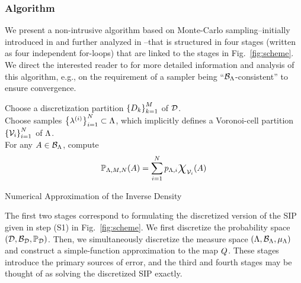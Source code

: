 \subsubsection{Algorithm}\label{sec:set-algorithm}
We present a non-intrusive algorithm based on Monte-Carlo sampling\---initially introduced in \cite{BET+14} and further analyzed in \cite{BET+14-arxiv}\---that is structured in four stages (written as four independent for-loops) that are linked to the stages in Fig.~\ref{fig:scheme}. 
We direct the interested reader to \cite{BET+14-arxiv} for more detailed information and analysis of this algorithm, e.g., on the requirement of a sampler being ``$\mathcal{B}_{{\Lambda}}$-consistent'' to ensure convergence. 


\begin{algorithm}[hbtp]
\DontPrintSemicolon
Choose a discretization partition $\left\{D_k\right\}_{k=1}^{M}$ of $\mathcal{D}$.\\
	Choose samples $\left\{\lambda^{(i)}\right\}_{i=1}^{N} \subset {\Lambda}$, which implicitly defines a Voronoi-cell partition $\left\{\mathcal{V}_i\right\}_{i=1}^{N}$ of ${\Lambda}$.\\
	For any $A\in \mathcal{B}_{{\Lambda}}$, compute 
	\begin{equation}
	\PP_{\pspace, \ndiscs, \nsamps} (A) = \sum_{\iparam=1}^\nsamps p_{\pspace, \iparam} \Chi_{\VV_\iparam} (A) 
	\end{equation}
 \caption{Numerical Approximation of the Inverse Density}
 \label{alg:inv_density}
\end{algorithm}
\FloatBarrier

The first two stages correspond to formulating the discretized version of the SIP given in step (S1) in Fig.~\ref{fig:scheme}. 
We first discretize the probability space $(\mathcal{D}, \mathcal{B}_{\mathcal{D}}, \operatorname*{\mathbb{P}_{\mathcal{D}}})$.
Then, we simultaneously discretize the measure space $({\Lambda}, \mathcal{B}_{{\Lambda}}, \mu_{{\Lambda}})$ and construct a simple-function approximation to the map $Q$.
These stages introduce the primary sources of error, and the third and fourth stages may be thought of as solving the discretized SIP exactly.

